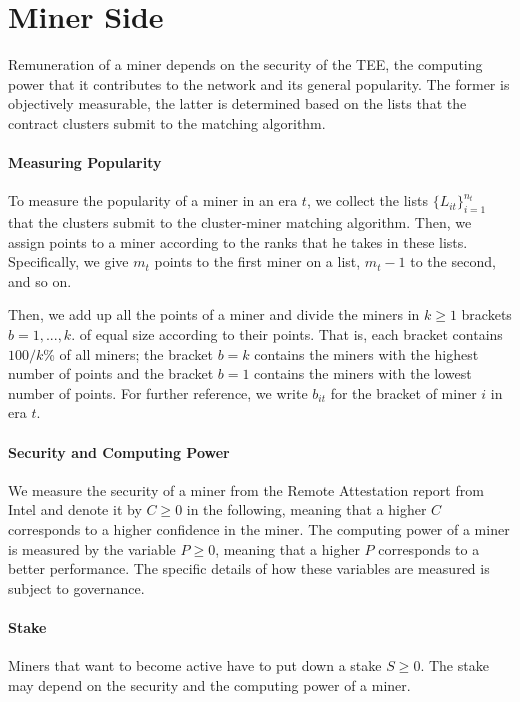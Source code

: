 \documentclass[11pt, a4paper, twocolumn]{article}
\begin{document}
\section{Miner Side}\label{sec:supply}
Remuneration of a miner depends on the security of the TEE, the computing power that it contributes to the network and its general popularity. The former is objectively measurable, the latter is determined based on the lists that the contract clusters submit to the matching algorithm.

\paragraph{Measuring Popularity} To measure the popularity of a miner in an era $t$, we collect the lists $\{L_{it}\}_{i=1}^{n_t}$ that the clusters submit to the cluster-miner matching algorithm. Then, we assign points to a miner according to the ranks that he takes in these lists. Specifically, we give $m_t$ points to the first miner on a list, $m_t-1$ to the second, and so on. 

Then, we add up all the points of a miner and divide the miners in $k \geq 1$ brackets $b = 1,...,k.$ of equal size according to their points. That is, each bracket contains $100/k$\% of all miners; the bracket $b=k$ contains the miners with the highest number of points and the bracket $b=1$ contains the miners with the lowest number of points. For further reference, we write $b_{it}$ for the bracket of miner $i$ in era $t$.

\paragraph{Security and Computing Power} We measure the security of a miner from the Remote Attestation report from Intel and denote it by $C \geq 0$ in the following, meaning that a higher $C$ corresponds to a higher confidence in the miner. The computing power of a miner is measured by the variable $P \geq 0$, meaning that a higher $P$ corresponds to a better performance. The specific details of how these variables are measured is subject to governance.

\paragraph{Stake} Miners that want to become active have to put down a stake $S \geq 0$. The stake may depend on the security and the computing power of a miner.
\end{document}
